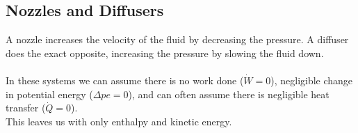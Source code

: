 \documentclass[12pt,a4paper]{article}
\begin{document}
    \subsection{Nozzles and Diffusers}
        A nozzle increases the velocity of the fluid by decreasing the pressure. A diffuser does the exact opposite, increasing the pressure by slowing the fluid down. \\
        \\
        In these systems we can assume there is no work done ($\dot{W}=0$), negligible change in potential energy ($\Delta pe = 0$), and can often assume there is negligible heat transfer ($\dot{Q} = 0$). \\
        This leaves us with only enthalpy and kinetic energy.
\end{document}
